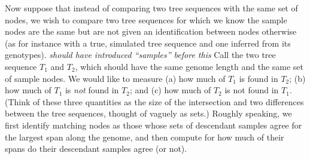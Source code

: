 \documentclass[10pt,twoside,lineno]{gsajnl}
\newcommand{\comment}[1]{{\color{violet} \it #1}}
\begin{document}
Now suppose that instead of comparing two tree sequences with the same set of nodes,
we wish to compare two tree sequences for which we know the sample nodes are the same
but are not given an identification between nodes otherwise
(as for instance with a true, simulated tree sequence and one inferred from its genotypes).
\comment{should have introduced ``samples'' before this}
Call the two tree sequence $T_1$ and $T_2$, which should have the same genome length
and the same set of sample nodes.
We would like to measure (a) how much of $T_1$ is found in $T_2$;
(b) how much of $T_1$ is \emph{not} found in $T_2$; and
(c) how much of $T_2$ is not found in $T_1$.
(Think of these three quantities as the size of the intersection
and two differences between the tree sequences,
thought of vaguely as sets.)
Roughly speaking, we first identify matching nodes
as those whose sets of descendant samples agree for the largest span along the genome,
and then compute for how much of their spans do their descendant samples agree (or not).
\end{document}
